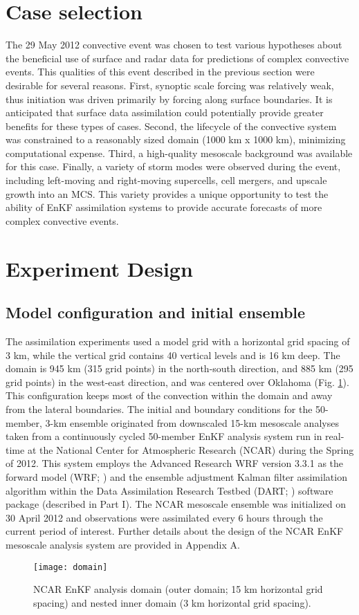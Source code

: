 \section{Case selection}
The 29 May 2012 convective event was chosen to test various hypotheses about the beneficial use of surface and radar data for predictions of complex convective events.  This qualities of this event described in the previous section were desirable for several reasons. First, synoptic scale forcing was relatively weak, thus initiation was driven primarily by forcing along surface boundaries. It is anticipated that surface data assimilation could potentially provide greater benefits for these types of cases. Second, the lifecycle of the convective system was constrained to a reasonably sized domain (1000 km x 1000 km), minimizing computational expense. Third, a high-quality mesoscale background was available for this case. Finally, a variety of storm modes were observed during the event, including left-moving and right-moving supercells, cell mergers, and upscale growth into an MCS. This variety provides a unique opportunity to test the ability of EnKF assimilation systems to provide accurate forecasts of more complex convective events.

\pagebreak
\section{Experiment Design}
\subsection{Model configuration and initial ensemble}
The assimilation experiments used a model grid with a horizontal grid spacing of 3 km, while the vertical grid contains 40 vertical levels and is 16 km deep. The domain is 945 km (315 grid points) in the north-south direction, and 885 km (295 grid points) in the west-east direction, and was centered over Oklahoma (Fig. \ref{domain}). This configuration keeps most of the convection within the domain and away from the lateral boundaries. The initial and boundary conditions for the 50-member, 3-km ensemble originated from downscaled 15-km mesoscale analyses taken from a continuously cycled 50-member EnKF analysis system run in real-time at the National Center for Atmospheric Research (NCAR) during the Spring of 2012. This system employs the Advanced Research WRF version 3.3.1 as the forward model (WRF; \citealt{skamarocketal08}) and the ensemble adjustment Kalman filter assimilation algorithm within the Data Assimilation Research Testbed (DART; \citealt{andersonetal09}) software package (described in Part I). The NCAR mesoscale ensemble was initialized on 30 April 2012 and observations were assimilated every 6 hours through the current period of interest. Further details about the design of the NCAR EnKF mesoscale analysis system are provided in Appendix A.
\begin{figure}
\centering
\texttt{[image: domain]}
\caption{NCAR EnKF analysis domain (outer domain; 15 km horizontal grid spacing) and nested inner domain (3 km horizontal grid spacing).}
\label{domain}
\end{figure}

